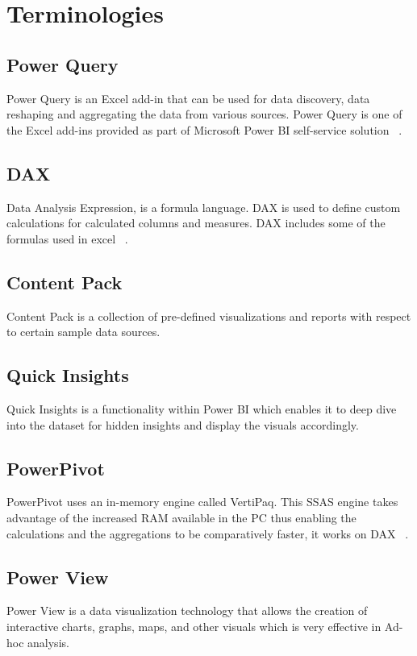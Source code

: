 \section{Terminologies}

\subsection{Power Query}
Power Query is an Excel add-in that can be used for data 
discovery, data reshaping and aggregating the data from various sources. 
Power Query is one of the Excel add-ins provided as part of Microsoft Power 
BI self-service solution ~\cite{hid-sp18-418-powerbi-intro}.

\subsection{DAX}
Data Analysis Expression, is a formula language. DAX is used to define 
custom calculations for calculated columns and measures. DAX includes some of 
the formulas used in excel ~\cite{hid-sp18-418-dax-basics}.

\subsection{Content Pack}
Content Pack is a collection of pre-defined visualizations and reports 
with respect to certain sample data sources.

\subsection{Quick Insights}
Quick Insights is a functionality within Power BI which enables it to 
deep dive into the dataset for hidden insights and display the 
visuals accordingly.

\subsection{PowerPivot}
PowerPivot uses an in-memory engine called VertiPaq. 
This SSAS engine takes advantage of the increased RAM available in the 
PC thus enabling the calculations and the aggregations to be comparatively 
faster, it works on DAX ~\cite{hid-sp18-418-powerpivot}.

\subsection{Power View}
Power View is a data visualization technology that allows the 
creation of interactive charts, graphs, maps, and other visuals which is 
very effective in Ad-hoc analysis.

